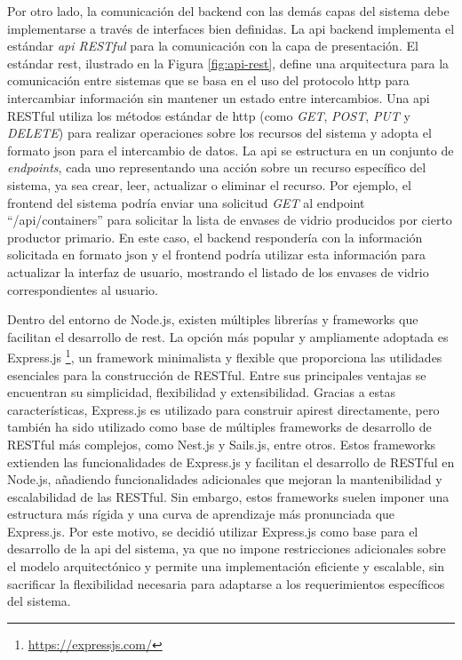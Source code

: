 Por otro lado, la comunicación del backend con las demás capas del sistema debe implementarse a través de interfaces bien definidas. La \acrshort{api} backend implementa el estándar \textit{\acrshort{api} RESTful} para la comunicación con la capa de presentación. El estándar \acrfull{rest}, ilustrado en la Figura \ref{fig:api-rest}, define una arquitectura para la comunicación entre sistemas que se basa en el uso del protocolo \acrshort{http} para intercambiar información sin mantener un estado entre intercambios. Una \acrshort{api} RESTful utiliza los métodos estándar de \acrshort{http} (como \textit{GET}, \textit{POST}, \textit{PUT} y \textit{DELETE}) para realizar operaciones sobre los recursos del sistema y adopta el formato \acrshort{json} para el intercambio de datos. La \acrshort{api} se estructura en un conjunto de \textit{\glspl{endpoint}}, cada uno representando una acción sobre un recurso específico del sistema, ya sea crear, leer, actualizar o eliminar el recurso. Por ejemplo, el frontend del sistema podría enviar una solicitud \textit{GET} al endpoint ``/api/containers'' para solicitar la lista de envases de vidrio producidos por cierto productor primario. En este caso, el backend respondería con la información solicitada en formato \acrshort{json} y el frontend podría utilizar esta información para actualizar la interfaz de usuario, mostrando el listado de los envases de vidrio correspondientes al usuario.

Dentro del entorno de Node.js, existen múltiples librerías y frameworks que facilitan el desarrollo de  \acrshort{rest}. La opción más popular y ampliamente adoptada es Express.js \footnote{\url{https://expressjs.com/}}, un framework minimalista y flexible que proporciona las utilidades esenciales para la construcción de  RESTful. Entre sus principales ventajas se encuentran su simplicidad, flexibilidad y extensibilidad. Gracias a estas características, Express.js es utilizado para construir \gls{apirest} directamente, pero también ha sido utilizado como base de múltiples frameworks de desarrollo de  RESTful más complejos, como Nest.js y Sails.js, entre otros. Estos frameworks extienden las funcionalidades de Express.js y facilitan el desarrollo de  RESTful en Node.js, añadiendo funcionalidades adicionales que mejoran la mantenibilidad y escalabilidad de las  RESTful. Sin embargo, estos frameworks suelen imponer una estructura más rígida y una curva de aprendizaje más pronunciada que Express.js. Por este motivo, se decidió utilizar Express.js como base para el desarrollo de la \acrshort{api} del sistema, ya que no impone restricciones adicionales sobre el modelo arquitectónico y permite una implementación eficiente y escalable, sin sacrificar la flexibilidad necesaria para adaptarse a los requerimientos específicos del sistema.

